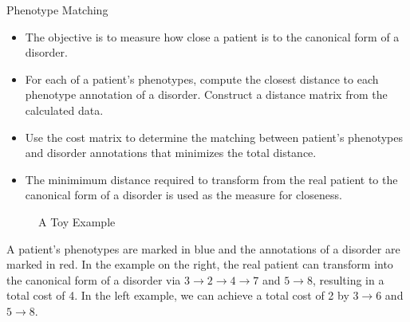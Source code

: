 \documentclass[final]{beamer} %
\begin{document}
\begin{frame}{}
\begin{columns}[T]
\begin{column}{0.3\linewidth}
{     \begin{block}{\Large Phenotype Matching}
       \begin{itemize}
         \Large
       \item The objective is to measure how close a patient is to the
         canonical form of a disorder.
       \item For each of a patient's phenotypes, compute the closest
         distance to each phenotype annotation of a
         disorder. Construct a distance matrix from the calculated data.
       \item Use the cost matrix to determine the matching between
         patient's phenotypes and disorder annotations that minimizes
         the total distance.
       \item The minimimum distance required to transform from the
         real patient to the canonical form of a disorder is used as
         the measure for closeness.
       \end{itemize}
       \vspace{0.5cm}
       \begin{figure}
         \centering
         \vspace{0.5cm}
         \caption*{\large A Toy Example}
       \end{figure}
           \Large A patient's phenotypes are marked in blue and the
           annotations of a disorder are marked in red. In the example
           on the right, the real patient can transform into the
           canonical form of a disorder via $3 \rightarrow 2
           \rightarrow 4 \rightarrow 7$ and $5 \rightarrow 8$,
           resulting in a total cost of 4. In the left example, we can
           achieve a total cost of 2 by $3 \rightarrow 6$ and $5
           \rightarrow 8$.
     \end{block}
   }
 \end{column}


\end{columns}
\end{frame}
\end{document}
